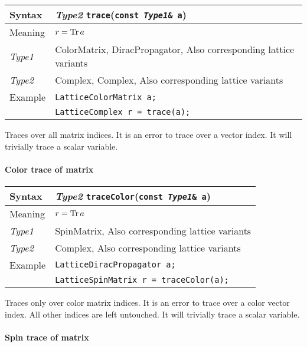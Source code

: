 \documentclass[12pt,letterpaper]{article}
\newcommand{\Tr}{\mathop{\rm Tr}}
\newcommand{\tLatticeComplex}{LatticeComplex}
\newcommand{\tLatticeColorMatrix}{LatticeColorMatrix}
\newcommand{\tLatticeSpinMatrix}{LatticeSpinMatrix}
\newcommand{\tLatticeDiracPropagator}{LatticeDiracPropagator}
\newcommand{\tComplex}{Complex}
\newcommand{\tColorMatrix}{ColorMatrix}
\newcommand{\tDiracPropagator}{DiracPropagator}
\newcommand{\tSpinMatrix}{SpinMatrix}
\newcommand{\simLatticeVariants}{Also corresponding lattice variants}
\begin{document}
\begin{flushleft}
  \begin{tabular}{|l|l|}
  \hline
  Syntax      & {\it Type2} \verb|trace|({\tt const {\it Type1}\& a})\\
  \hline
  Meaning     & $r = \Tr a$ \\
  \hline
  {\it Type1} & \tColorMatrix, \tDiracPropagator, \simLatticeVariants\\
  {\it Type2} & \tComplex, \tComplex, \simLatticeVariants\\
  \hline
  Example     & {\tt \tLatticeColorMatrix{} a;}\\
              & {\tt \tLatticeComplex{} r = trace(a);} \\
  \hline
  \end{tabular}
\end{flushleft}

Traces over all matrix indices. It is an error to trace over a vector index.
It will trivially trace a scalar variable.

\paragraph{Color trace of matrix}

\begin{flushleft}
  \begin{tabular}{|l|l|}
  \hline
  Syntax      & {\it Type2} \verb|traceColor|({\tt const {\it Type1}\& a})\\
  \hline
  Meaning     & $r = \Tr a$ \\
  \hline
  {\it Type1} & \tSpinMatrix, \simLatticeVariants\\
  {\it Type2} & \tComplex, \simLatticeVariants\\
  \hline
  \hline
  Example     & {\tt \tLatticeDiracPropagator{} a;}\\
              & {\tt \tLatticeSpinMatrix{} r = traceColor(a);} \\
  \hline
  \end{tabular}
\end{flushleft}

Traces only over color matrix indices. It is an error to trace over a color vector index.
All other indices are left untouched.
It will trivially trace a scalar variable.

\paragraph{Spin trace of matrix}
\end{document}
